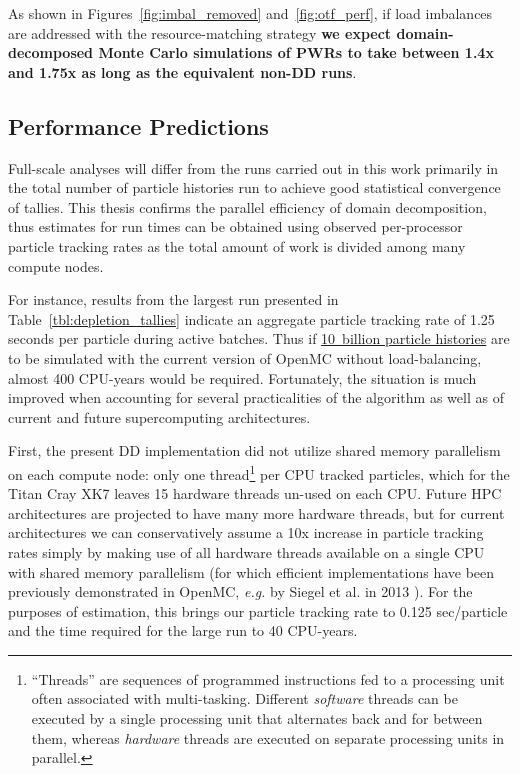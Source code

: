 \documentclass[12pt,twoside]{mitthesis-exec}
\begin{document}
As shown in Figures~\ref{fig:imbal_removed} and~\ref{fig:otf_perf}, if load
imbalances are addressed with the resource-matching strategy \textbf{we expect
domain-decomposed Monte Carlo simulations of PWRs to take between 1.4x and 1.75x
as long as the equivalent non-DD runs}.

\newpage
\subsection*{Performance Predictions}

Full-scale analyses will differ from the runs carried out in this work
primarily in the total number of particle histories run to achieve good
statistical convergence of tallies. This thesis confirms the parallel efficiency
of domain decomposition, thus estimates for run times can be obtained using
observed per-processor particle tracking rates as the total amount of work is
divided among many compute nodes.

For instance, results from the largest run presented in
Table~\ref{tbl:depletion_tallies} indicate an aggregate particle tracking rate
of 1.25 seconds per particle during active batches. Thus if \ul{10~billion
particle histories} are to be simulated with the current version of OpenMC
without load-balancing, almost 400 CPU-years would be required. Fortunately, the
situation is much improved when accounting for several practicalities of the
algorithm as well as of current and future supercomputing architectures.

First, the present DD implementation did not utilize shared memory parallelism
on each compute node: only one thread\footnote{``Threads'' are sequences of
programmed instructions fed to a processing unit often associated with
multi-tasking. Different \emph{software} threads can be executed by a single
processing unit that alternates back and for between them, whereas
\emph{hardware} threads are executed on separate processing units in parallel.}
per CPU tracked particles, which for the Titan Cray XK7 leaves 15 hardware
threads un-used on each CPU. Future HPC architectures are projected to have many
more hardware threads, but for current architectures we can conservatively
assume a 10x increase in particle tracking rates simply by making use of all
hardware threads available on a single CPU with shared memory parallelism (for
which efficient implementations have been previously demonstrated in OpenMC,
\emph{e.g.} by Siegel et al. in 2013 \cite{Siegel_multicore_openmc}). For the
purposes of estimation, this brings our particle tracking rate to 0.125
sec/particle and the time required for the large run to 40 CPU-years.
\end{document}
